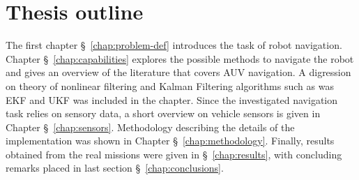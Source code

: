 \section{Thesis outline}
The first chapter \S~\ref{chap:problem-def} introduces the task of robot navigation. Chapter \S~\ref{chap:capabilities} explores the possible methods to navigate the robot and gives an overview of the literature that covers AUV navigation. A digression on theory of nonlinear filtering and Kalman Filtering algorithms such as was EKF and UKF was included in the chapter. Since the investigated navigation task relies on sensory data, a short overview on vehicle sensors is given in Chapter \S~\ref{chap:sensors}. Methodology describing the details of the implementation was shown in Chapter \S~\ref{chap:methodology}. Finally, results obtained from the real missions were given in \S~\ref{chap:results}, with concluding remarks placed in last section \S~\ref{chap:conclusions}.
